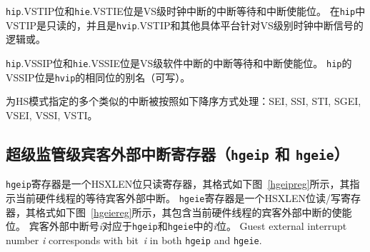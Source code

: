 {\tt hip}.VSTIP位和{\tt hie}.VSTIE位是VS级时钟中断的中断等待和中断使能位。
在{\tt hip}中VSTIP是只读的，并且是{\tt hvip}.VSTIP和其他具体平台针对VS级别时钟中断信号的逻辑或。

{\tt hip}.VSSIP位和{\tt hie}.VSSIE位是VS级软件中断的中断等待和中断使能位。
{\tt hip}的VSSIP位是{\tt hvip}的相同位的别名（可写）。

为HS模式指定的多个类似的中断被按照如下降序方式处理：SEI, SSI, STI, SGEI, VSEI, VSSI, VSTI。

\subsection{超级监管级宾客外部中断寄存器（{\tt hgeip} 和 {\tt hgeie}）}
\label{sec:hgeinterruptregs}

{\tt hgeip}寄存器是一个HSXLEN位只读寄存器，其格式如下图~\ref{hgeipreg}所示，其指示当前硬件线程的等待宾客外部中断。
{\tt hgeie}寄存器是一个HSXLEN位读/写寄存器，其格式如下图~\ref{hgeiereg}所示，其包含当前硬件线程的宾客外部中断的使能位。
宾客外部中断号\textit{i}对应于{\tt hgeip}和{\tt hgeie}中的\textit{i}位。
Guest external interrupt number \textit{i} corresponds with
bit~\textit{i} in both {\tt hgeip} and {\tt hgeie}.


